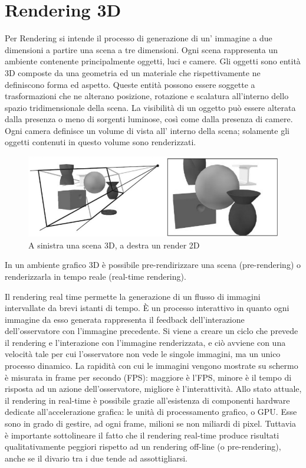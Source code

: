 \section{Rendering 3D}
\label{sec:chapter_stato_arte_rendering3d}

Per Rendering si intende il processo di generazione di un’ immagine a due dimensioni a partire una scena a tre dimensioni.
Ogni scena rappresenta un  ambiente contenente principalmente oggetti, luci e camere.
Gli oggetti sono entità 3D composte da una geometria ed un materiale che rispettivamente ne definiscono forma ed aspetto. Queste entità possono essere soggette a trasformazioni che ne alterano posizione, rotazione e scalatura all’interno dello spazio tridimensionale della scena.
La visibilità di un oggetto può essere alterata dalla presenza o meno di sorgenti luminose, così come dalla presenza di camere.
Ogni camera definisce un volume di vista all’ interno della scena; solamente gli oggetti contenuti in questo volume sono renderizzati.
\\
\begin{figure}[htb]
 \centering
 \includegraphics[width=0.8\linewidth]{images/chapter_stato_arte/stato_arte_rendering_3d.png}\hfill
 \caption[Rendering 3D]{A sinistra una scena 3D, a destra un render 2D}
 \label{fig:stato_arte_rendering_3d}
\end{figure}

In un ambiente grafico 3D è possibile pre-rendirizzare una scena (pre-rendering) o renderizzarla in tempo reale (real-time rendering).

Il rendering real time permette la generazione di un flusso di immagini intervallate da brevi istanti di tempo.
È un processo interattivo in quanto ogni immagine da esso generata rappresenta il feedback dell’interazione dell’osservatore con l’immagine precedente. 
Si viene a creare un ciclo che prevede il rendering e l’interazione con l’immagine renderizzata, e ciò avviene con una velocità tale per cui l’osservatore non vede le singole immagini, ma un unico processo dinamico. 
La rapidità con cui le immagini vengono mostrate su schermo è misurata in frame per secondo (FPS): maggiore è l’FPS, minore è il tempo di risposta ad un azione dell’osservatore, migliore è l’interattività. 
Allo stato attuale, il rendering in real-time è possibile grazie all’esistenza di componenti hardware dedicate all’accelerazione grafica: le unità di processamento grafico, o GPU. 
Esse sono in grado di gestire, ad ogni frame, milioni se non miliardi di pixel. Tuttavia è importante sottolineare il fatto che il rendering real-time produce risultati qualitativamente peggiori rispetto ad un rendering off-line (o pre-rendering), anche se il divario tra i due tende ad assottigliarsi. 

